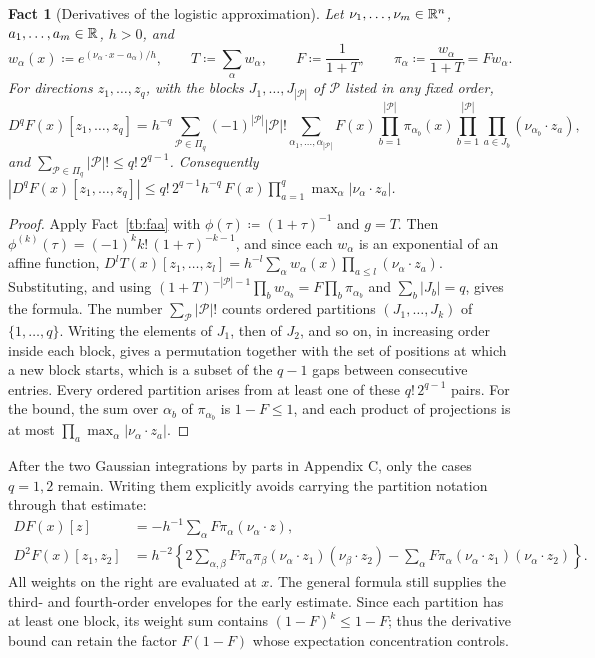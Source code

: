 \documentclass[11pt,letterpaper]{article}
\theoremstyle{plain}
\newtheorem{fact}{Fact}[section]
\begin{document}
\begin{fact}[Derivatives of the logistic approximation]\label{tb:logistic}
Let \(\nu_1,\ldots,\nu_m\in\mathbb R^n\), \(a_1,\ldots,a_m\in\mathbb R\), \(h>0\), and
\[
 w_\alpha(x)\coloneqq e^{(\nu_\alpha\cdot x-a_\alpha)/h},\qquad
 T\coloneqq \sum_\alpha w_\alpha,\qquad
 F\coloneqq \frac1{1+T},\qquad
 \pi_\alpha\coloneqq \frac{w_\alpha}{1+T}=Fw_\alpha .
\]
For directions \(z_1,\ldots,z_q\), with the blocks \(J_1,\ldots,J_{|\mathcal P|}\)
of \(\mathcal P\) listed in any fixed order,
\[
 D^qF(x)[z_1,\ldots,z_q]
 =h^{-q}\sum_{\mathcal P\in\Pi_q}(-1)^{|\mathcal P|}|\mathcal P|!
 \sum_{\alpha_1,\ldots,\alpha_{|\mathcal P|}}
 F(x)\prod_{b=1}^{|\mathcal P|}\pi_{\alpha_b}(x)
 \prod_{b=1}^{|\mathcal P|}\prod_{a\in J_b}(\nu_{\alpha_b}\cdot z_a),
\]
and \(\sum_{\mathcal P\in\Pi_q}|\mathcal P|!\le q!\,2^{q-1}\). Consequently
\(|D^qF(x)[z_1,\ldots,z_q]|\le q!\,2^{q-1}h^{-q}\,F(x)\prod_{a=1}^q
\max_\alpha|\nu_\alpha\cdot z_a|\).
\end{fact}

\begin{proof}
Apply Fact~\ref{tb:faa} with \(\phi(\tau)\coloneqq (1+\tau)^{-1}\) and \(g=T\). Then
\(\phi^{(k)}(\tau)=(-1)^kk!\,(1+\tau)^{-k-1}\), and since each \(w_\alpha\) is
an exponential of an affine function,
\(D^lT(x)[z_1,\ldots,z_l]=h^{-l}\sum_\alpha w_\alpha(x)\prod_{a\le l}
(\nu_\alpha\cdot z_a)\). Substituting, and using
\((1+T)^{-|\mathcal P|-1}\prod_bw_{\alpha_b}=F\prod_b\pi_{\alpha_b}\) and
\(\sum_b|J_b|=q\), gives the formula. The number
\(\sum_{\mathcal P}|\mathcal P|!\) counts ordered partitions
\((J_1,\ldots,J_k)\) of \(\{1,\ldots,q\}\). Writing the elements of
\(J_1\), then of \(J_2\), and so on, in increasing order inside each block,
gives a permutation together with the set of positions at which a new block
starts, which is a subset of the \(q-1\) gaps between consecutive entries.
Every ordered partition arises from at least one of these
\(q!\,2^{q-1}\) pairs. For the bound, the sum over \(\alpha_b\) of
\(\pi_{\alpha_b}\) is \(1-F\le1\), and each product of projections is
at most \(\prod_a\max_\alpha|\nu_\alpha\cdot z_a|\).
\end{proof}

After the two Gaussian integrations by parts in Appendix C, only
the cases \(q=1,2\) remain. Writing them explicitly avoids carrying
the partition notation through that estimate:
\begin{align*}
 DF(x)[z]&=-h^{-1}\sum_\alpha F\pi_\alpha(\nu_\alpha\cdot z),\\
 D^2F(x)[z_1,z_2]
 &=h^{-2}\left\{2\sum_{\alpha,\beta}F\pi_\alpha\pi_\beta
       (\nu_\alpha\cdot z_1)(\nu_\beta\cdot z_2)
       -\sum_\alpha F\pi_\alpha
       (\nu_\alpha\cdot z_1)(\nu_\alpha\cdot z_2)\right\}.
\end{align*}
All weights on the right are evaluated at \(x\). The general formula
still supplies the third- and fourth-order envelopes for the early
estimate. Since each partition has at least one block, its weight
sum contains \((1-F)^k\le1-F\); thus the derivative bound can retain
the factor \(F(1-F)\) whose expectation concentration controls.
\end{document}
